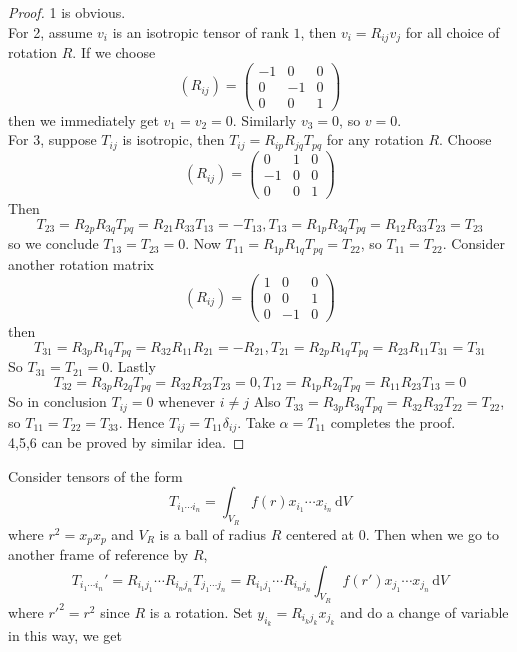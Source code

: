 \begin{proof}
    1 is obvious.\\
    For 2, assume $v_i$ is an isotropic tensor of rank $1$, then $v_i=R_{ij}v_j$ for all choice of rotation $R$.
    If we choose
    $$(R_{ij})=\begin{pmatrix}
        -1&0&0\\
        0&-1&0\\
        0&0&1
    \end{pmatrix}$$
    then we immediately get $v_1=v_2=0$.
    Similarly $v_3=0$, so $v=0$.\\
    For 3, suppose $T_{ij}$ is isotropic, then $T_{ij}=R_{ip}R_{jq}T_{pq}$ for any rotation $R$.
    Choose
    $$(R_{ij})=\begin{pmatrix}
        0&1&0\\
        -1&0&0\\
        0&0&1
    \end{pmatrix}$$
    Then
    $$T_{23}=R_{2p}R_{3q}T_{pq}=R_{21}R_{33}T_{13}=-T_{13},T_{13}=R_{1p}R_{3q}T_{pq}=R_{12}R_{33}T_{23}=T_{23}$$
    so we conclude $T_{13}=T_{23}=0$.
    Now $T_{11}=R_{1p}R_{1q}T_{pq}=T_{22}$, so $T_{11}=T_{22}$.
    Consider another rotation matrix
    $$(R_{ij})=\begin{pmatrix}
        1&0&0\\
        0&0&1\\
        0&-1&0
    \end{pmatrix}$$
    then
    $$T_{31}=R_{3p}R_{1q}T_{pq}=R_{32}R_{11}R_{21}=-R_{21},T_{21}=R_{2p}R_{1q}T_{pq}=R_{23}R_{11}T_{31}=T_{31}$$
    So $T_{31}=T_{21}=0$.
    Lastly
    $$T_{32}=R_{3p}R_{2q}T_{pq}=R_{32}R_{23}T_{23}=0,T_{12}=R_{1p}R_{2q}T_{pq}=R_{11}R_{23}T_{13}=0$$
    So in conclusion $T_{ij}=0$ whenever $i\neq j$
    Also $T_{33}=R_{3p}R_{3q}T_{pq}=R_{32}R_{32}T_{22}=T_{22}$, so $T_{11}=T_{22}=T_{33}$.
    Hence $T_{ij}=T_{11}\delta_{ij}$.
    Take $\alpha=T_{11}$ completes the proof.\\
    4,5,6 can be proved by similar idea.
\end{proof}
Consider tensors of the form
$$T_{i_1\cdots i_n}=\int_{V_R}f(r)x_{i_1}\cdots x_{i_n}\,\mathrm dV$$
where $r^2=x_px_p$ and $V_R$ is a ball of radius $R$ centered at $0$.
Then when we go to another frame of reference by $R$,
$$T_{i_1\cdots i_n}'=R_{i_1j_1}\cdots R_{i_nj_n}T_{j_1\cdots j_n}=R_{i_1j_1}\cdots R_{i_nj_n}\int_{V_R}f(r')x_{j_1}\cdots x_{j_n}\,\mathrm dV$$
where $r'^2=r^2$ since $R$ is a rotation.
Set $y_{i_k}=R_{i_kj_k}x_{j_k}$ and do a change of variable in this way, we get
